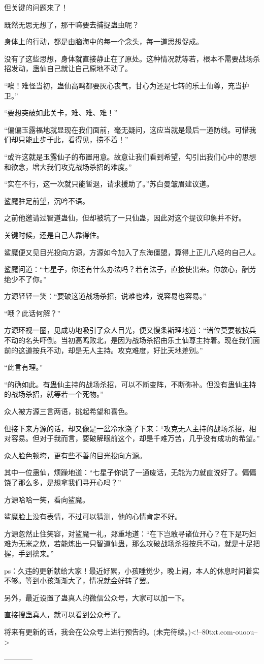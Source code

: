 \begin{this_body}
但关键的问题来了！

既然无思无想了，那干嘛要去捕捉蛊虫呢？

身体上的行动，都是由脑海中的每一个念头，每一道思想促成。

没有了这些思想，身体就直接静止在了原处。这种情况就等若，根本不需要战场杀招发动，蛊仙自己就让自己原地不动了。

“唉！难怪当初，蛊仙高鸣都要灰心丧气，甘心为还是七转的乐土仙尊，充当护卫。”

“要想突破如此关卡，难、难、难！”

“偏偏玉露福地就显现在我们面前，毫无疑问，这应当就是最后一道防线。可惜我们却只能止步于此，看得见，捞不着！”

“或许这就是玉露仙子的布置用意。故意让我们看到希望，勾引出我们心中的思想和欲念，增大我们攻克战场杀招的难度。”

“实在不行，这一次就只能暂退，请求援助了。”苏白曼皱眉建议道。

鲨魔驻足前望，沉吟不语。

之前他邀请过智道蛊仙，但却被坑了一只仙蛊，因此对这个提议印象并不好。

关键时候，还是自己人靠得住。

鲨魔便又见目光投向方源，方源如今加入了东海僵盟，算得上正儿八经的自己人。

鲨魔问道：“七星子，你还有什么办法吗？若有法子，直接使出来。你放心，酬劳绝少不了你。”

方源轻轻一笑：“要破这道战场杀招，说难也难，说容易也容易。”

“哦？此话何解？”

方源环视一圈，见成功地吸引了众人目光，便又慢条斯理地道：“诸位莫要被按兵不动的名头吓倒。当初高鸣败北，是因为战场杀招由乐土仙尊主持着。现在我们面前的这道按兵不动，却是无人主持。攻克难度，好比天地差别。”

“此言有理。”

“的确如此。有蛊仙主持的战场杀招，可以不断变阵，不断弥补。但没有蛊仙主持的战场杀招，就等若一个死物。”

众人被方源三言两语，挑起希望和喜色。

但接下来方源的话，却又像是一盆冷水浇了下来：“攻克无人主持的战场杀招，相对容易。但对于我而言，要破解眼前这个，却是千难万苦，几乎没有成功的希望。”

众人脸色顿垮，更有些不善的目光投向方源。

其中一位蛊仙，烦躁地道：“七星子你说了一通废话，无能为力就直说好了。偏偏饶了那么多，是想拿我们寻开心吗？”

方源哈哈一笑，看向鲨魔。

鲨魔脸上没有表情，不过可以猜测，他的心情肯定不好。

方源忽然止住笑容，对鲨魔一礼，郑重地道：“在下岂敢寻诸位开心？在下是巧妇难为无米之炊，若能炼出一只智道仙蛊，那么攻破战场杀招按兵不动，就是十足把握，手到擒来。”

ps：久违的更新献给大家！最近好累，小孩睡觉少，晚上闹，本人的休息时间着实不够。等到小孩渐渐大了，情况就会好转了罢。

另外，最近设置了蛊真人的微信公众号，大家可以加一下。

直接搜蛊真人，就可以看到公众号了。

将来有更新的话，我会在公众号上进行预告的。(未完待续。)<!--80txt.com-ouoou-->

------------

\end{this_body}

